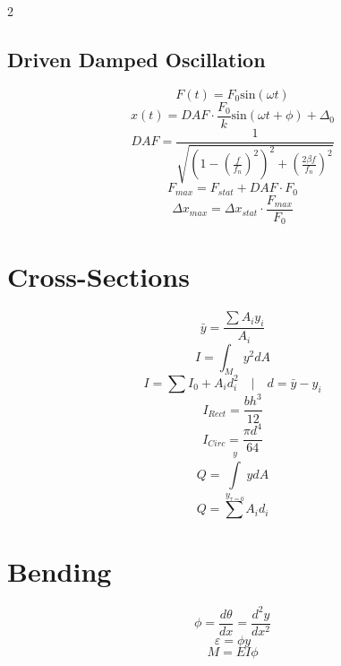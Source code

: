 \documentclass[14pt]{article}
\begin{document}
\begin{multicols}{2}
    \subsection{Driven Damped Oscillation}
    \begin{equation}
        F(t)=F_0\text{sin}(\omega t)
    \end{equation}
    \begin{equation}
        x(t)=DAF\cdot \frac{F_0}{k} \text{sin}(\omega t + \phi)+\Delta_0
    \end{equation}
    \begin{equation}
        DAF=\frac{1}{\sqrt{\left(1-\left(\frac{f}{f_n}\right)^2\right)^2+\left(\frac{2\beta f}{f_n}\right)^2}}
    \end{equation}
    \begin{equation}
        F_{max}=F_{stat}+DAF\cdot F_0
    \end{equation}
    \begin{equation}
        \Delta x_{max} = \Delta x_{stat} \cdot \frac{F_{max}}{F_0}
    \end{equation}
    \section{Cross-Sections}
    \begin{equation}
        \bar{y}=\frac{\sum A_i y_i }{A_i}
    \end{equation}
    \begin{equation}
        I=\int_M y^2 dA
    \end{equation}
    \begin{equation}
        I=\sum I_0 + A_i d_i^2
        \quad | \quad d=\bar{y}-y_i
    \end{equation}
    \begin{equation}
        I_{Rect}=\frac{bh^3}{12}
    \end{equation}
    \begin{equation}
        I_{Circ}=\frac{\pi d^4}{64}
    \end{equation}
    \begin{equation}
        Q=\int \limits_{y_{\tau=0}}^{y} y dA
    \end{equation}
    \begin{equation}
        Q=\sum A_i d_i
    \end{equation}
    \section{Bending}
    \begin{equation}
        \phi=\frac{d\theta}{dx}=\frac{d^2y}{dx^2}
    \end{equation}
    \begin{equation}
        \varepsilon=\phi y
    \end{equation}
    \begin{equation}
        M=EI\phi
    \end{equation}

\end{multicols}
\end{document}
